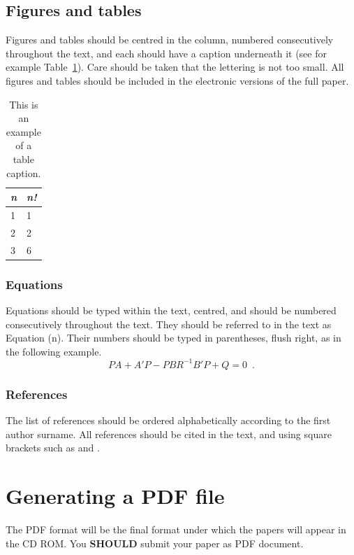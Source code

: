 \documentclass{article}\usepackage{graphicx, color}
\begin{document}
\subsection{Figures and tables}
Figures and tables should be centred in the column,
numbered consecutively throughout the text, and each
should have a caption underneath it (see for example
Table~\ref{tab1}). Care should be taken that the lettering
is not too small. All figures and tables should be included
in the electronic versions of the full paper.


\begin{table}[htb!]
\begin{center}

\begin{tabular}{|l|l|}
\hline
{\em n} & {\em n!} \\
\hline
1 & 1  \\
2 & 2  \\
3  & 6\\
\hline
\end{tabular}
\end{center}
\caption{\label{tab1}This is an example of a table caption.}
\end{table}

\subsubsection{Equations}
Equations should be typed within the text, centred, and
should be numbered consecutively throughout the text.
They should be referred to in the text as Equation (n).
Their numbers should be typed in parentheses, flush right,
as in the following example.
\begin{equation}
	    PA + A'P - PBR^{-1}B'P + Q  =  0 \enspace.
\end{equation}

\subsubsection{References}
The list of references should be ordered alphabetically
according to the first author surname. All references
should be cited in the text, and using square brackets such
as \cite{ref01} and \cite{ref02}.

\section{Generating a {PDF} file}
The PDF format will be the final format under which the
papers will appear in the {CD ROM}. You {\bf SHOULD}
submit your paper as {PDF} document.
\end{document}

